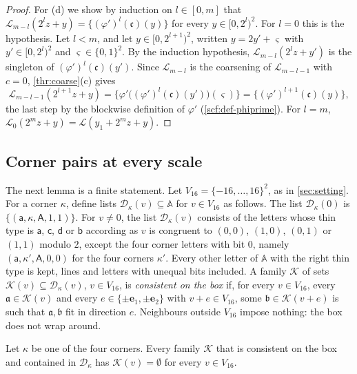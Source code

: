 \begin{proof}
For (d) we show by induction on $l\in[0,m]$ that $\mathcal L_{m-l}(2^lz+y)=\{(\varphi')^l(\mathfrak c)(y)\}$ for every $y\in[0,2^l)^2$. For $l=0$ this is the hypothesis. Let $l<m$, and let $y\in[0,2^{l+1})^2$, written $y=2y'+\varsigma$ with $y'\in[0,2^l)^2$ and $\varsigma\in\{0,1\}^2$. By the induction hypothesis, $\mathcal L_{m-l}(2^lz+y')$ is the singleton of $(\varphi')^l(\mathfrak c)(y')$. Since $\mathcal L_{m-l}$ is the coarsening of $\mathcal L_{m-l-1}$ with $c=0$, \cref{thr:coarse}(c) gives
\[
\mathcal L_{m-l-1}(2^{l+1}z+y)=\bigl\{\varphi'\bigl((\varphi')^l(\mathfrak c)(y')\bigr)(\varsigma)\bigr\}=\bigl\{(\varphi')^{l+1}(\mathfrak c)(y)\bigr\},
\]
the last step by the blockwise definition of $\varphi'$ (\cref{scf:def-phiprime}). For $l=m$, $\mathcal L_0(2^mz+y)=\mathcal L(y_1+2^mz+y)$.
\end{proof}

\subsection{Corner pairs at every scale}\label{thr:sec-pairs}

The next lemma is a finite statement. Let $V_{16}=\{-16,\dots,16\}^2$, as in \cref{sec:setting}. For a corner $\kappa$, define lists $\mathcal D_\kappa(v)\subseteq\mathbb A$ for $v\in V_{16}$ as follows. The list $\mathcal D_\kappa(0)$ is $\{(\mathsf a,\kappa,\mathsf A,1,1)\}$. For $v\ne0$, the list $\mathcal D_\kappa(v)$ consists of the letters whose thin type is $\mathsf a$, $\mathsf c$, $\mathsf d$ or $\mathsf b$ according as $v$ is congruent to $(0,0)$, $(1,0)$, $(0,1)$ or $(1,1)$ modulo $2$, except the four corner letters with bit $0$, namely $(\mathsf a,\kappa',\mathsf A,0,0)$ for the four corners $\kappa'$. Every other letter of $\mathbb A$ with the right thin type is kept, lines and letters with unequal bits included. A family $\mathcal K$ of sets $\mathcal K(v)\subseteq\mathcal D_\kappa(v)$, $v\in V_{16}$, is \emph{consistent on the box} if, for every $v\in V_{16}$, every $\mathfrak a\in\mathcal K(v)$ and every $e\in\{\pm\mathbf e_1,\pm\mathbf e_2\}$ with $v+e\in V_{16}$, some $\mathfrak b\in\mathcal K(v+e)$ is such that $\mathfrak a,\mathfrak b$ fit in direction $e$. Neighbours outside $V_{16}$ impose nothing: the box does not wrap around.

\begin{lemma}\label{thr:corner}
Let $\kappa$ be one of the four corners. Every family $\mathcal K$ that is consistent on the box and contained in $\mathcal D_\kappa$ has $\mathcal K(v)=\emptyset$ for every $v\in V_{16}$.
\end{lemma}

